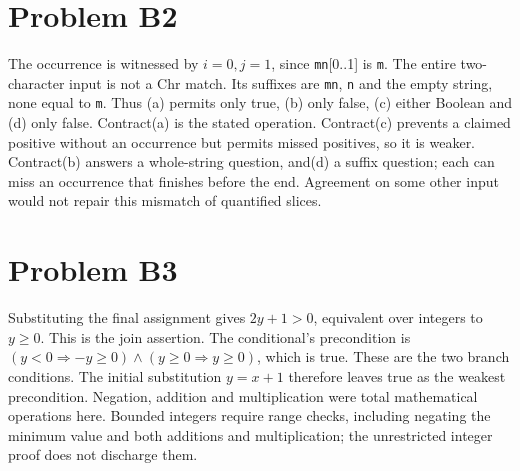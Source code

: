\documentclass[11pt]{article}
\begin{document}
\section*{Problem B2}\label{ans:B2}
\begin{answer}
The occurrence is witnessed by $i=0,j=1$, since \texttt{mn}[0..1] is
\texttt{m}. The entire two-character input is not a Chr match. Its suffixes
are \texttt{mn}, \texttt{n} and the empty string, none equal to \texttt{m}.
Thus (a) permits only true, (b) only false, (c) either Boolean and (d) only
false. Contract(a) is the stated operation. Contract(c) prevents a claimed
positive without an occurrence but permits missed positives, so it is weaker.
Contract(b) answers a whole-string question, and(d) a suffix question; each
can miss an occurrence that finishes before the end. Agreement on some other
input would not repair this mismatch of quantified slices.
\end{answer}
\section*{Problem B3}\label{ans:B3}
\begin{answer}
Substituting the final assignment gives $2y+1>0$, equivalent over integers
to $y\geq0$. This is the join assertion. The conditional's precondition is
$(y<0\Rightarrow -y\geq0)\land(y\geq0\Rightarrow y\geq0)$, which is true.
These are the two branch conditions. The initial substitution $y=x+1$
therefore leaves true as the weakest precondition. Negation, addition and
multiplication were total mathematical operations here. Bounded integers
require range checks, including negating the minimum value and both additions
and multiplication; the unrestricted integer proof does not discharge them.
\end{answer}
\end{document}
